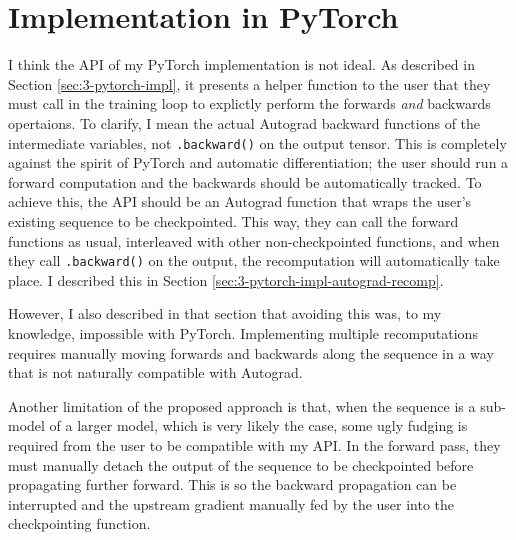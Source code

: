 \section{Implementation in PyTorch}
I think the API of my PyTorch implementation is not ideal.
As described in Section \ref{sec:3-pytorch-impl}, it presents a helper function to the user that they must call in the training loop to explictly perform the forwards \textit{and} backwards opertaions.
To clarify, I mean the actual Autograd backward functions of the intermediate variables, not \texttt{.backward()} on the output tensor.
This is completely against the spirit of PyTorch and automatic differentiation;
the user should run a forward computation and the backwards should be automatically tracked.
To achieve this, the API should be an Autograd function that wraps the user's existing sequence to be checkpointed.
This way, they can call the forward functions as usual, interleaved with other non-checkpointed functions, and when they call \texttt{.backward()} on the output, the recomputation will automatically take place.
I described this in Section \ref{sec:3-pytorch-impl-autograd-recomp}.

However, I also described in that section that avoiding this was, to my knowledge, impossible with PyTorch.
Implementing multiple recomputations requires manually moving forwards and backwards along the sequence in a way that is not naturally compatible with Autograd.

Another limitation of the proposed approach is that, when the sequence is a sub-model of a larger model, which is very likely the case, some ugly fudging is required from the user to be compatible with my API.
In the forward pass, they must manually detach the output of the sequence to be checkpointed before propagating further forward.
This is so the backward propagation can be interrupted and the upstream gradient manually fed by the user into the checkpointing function.
